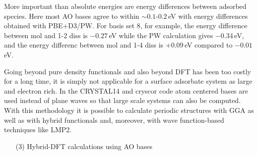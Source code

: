 \documentclass[11pt,DIV=13,BCOR=5mm,a4paper,headinclude]{scrbook}
\begin{document}
More important than absolute energies are energy differences between adsorbed species.
Here most AO bases agree to within $\sim 0.1$-$0.2\,$eV with energy differences obtained with PBE+D3/PW.
For basis set 8, for example, the energy difference between mol and 1-2 diss is $-0.27\,$eV while the PW calculation gives $-0.34\,$eV, and the energy differenc between mol and 1-4 diss is $+0.09\,$eV compared to $-0.01\,$eV.

Going beyond pure density functionals and also beyond DFT has been too costly for a long time, it is simply not applicable for a surface adsorbate system as large and electron rich.
In the CRYSTAL14\cite{crystal14} and cryscor\cite{cryscor} code atom centered bases are used instead of plane waves so that large scale systems can also be computed.
With this methodology it is possible to calculate periodic structures with GGA as well as with hybrid functionals and, moreover, with wave function-based techniques like LMP2.
\begin{enumerate}
 \item[(3)] Hybrid-DFT calculations using AO bases
\end{enumerate}
\end{document}
